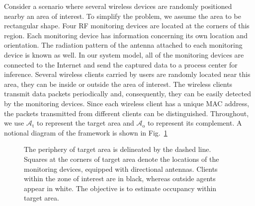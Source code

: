 Consider a scenario where several wireless devices are randomly positioned nearby an area of interest.
To simplify the problem, we assume the area to be rectangular shape.
Four RF monitoring devices are located at the corners of this region.
Each monitoring device has information concerning its own location and orientation.
The radiation pattern of the antenna attached to each monitoring device is known as well.
In our system model, all of the monitoring devices are connected to the Internet and send the captured data to a process center for inference.
Several wireless clients carried by users are randomly located near this area, they can be inside or outside the area of interest.
The wireless clients transmit data packets periodically and, consequently, they can be easily detected by the monitoring devices.
Since each wireless client has a unique MAC address, the packets transmitted from different clients can be distinguished.
Throughout, we use $\mathcal{A}_{\mathrm{t}}$ to represent the target area and $\mathcal{A}_{\mathrm{o}}$ to represent its complement.
A notional diagram of the framework is shown in Fig.~\ref{figure:NotionalDiagram}
\begin{figure}[t]
\centerline{}
\caption{The periphery of target area is delineated by the dashed line. 
Squares at the corners of target area denote the locations of the monitoring devices, equipped with directional antennas.
Clients within the zone of interest are in black, whereas outside agents appear in white.
The objective is to estimate occupancy within target area.}
\label{figure:NotionalDiagram}
\end{figure}

